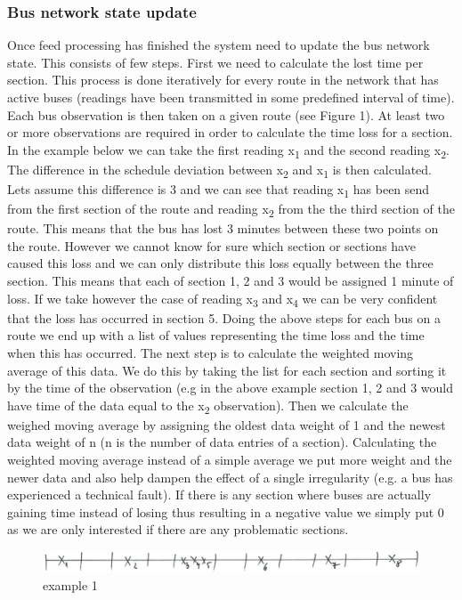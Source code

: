 \subsubsection{Bus network state update}
Once feed processing has finished the system need to update the bus network state. This consists of few steps. First we need to calculate the lost time per section. This process is done iteratively for every route in the network that has active buses (readings have been transmitted in some predefined interval of time). Each bus observation is then taken on a given route (see Figure 1). At least two or more observations are required in order to calculate the time loss for a section. In the example below we can take the first reading x\textsubscript{1} and the second reading x\textsubscript{2}.
The difference in the schedule deviation between x\textsubscript{2} and x\textsubscript{1} is then calculated. Lets assume this difference is 3 and we can see that reading x\textsubscript{1} has been send from the first section of the route and reading x\textsubscript{2} from the the third section of the route. This means that the bus has lost 3 minutes between these two points on the route. However we cannot know for sure which section or sections have caused this loss and we can only distribute this loss equally between the three section. This means that each of section 1, 2 and 3 would be assigned 1 minute of loss. If we take however the case of reading x\textsubscript{3} and x\textsubscript{4} we can be very confident that the loss has occurred in section 5. Doing the above steps for each bus on a route we end up with a list of values representing the time loss and the time when this has occurred. The next step is to calculate the weighted moving average of this data. We do this by taking the list for each section and sorting it by the time of the observation (e.g in the above example section 1, 2 and 3 would have time of the data equal to the x\textsubscript{2} observation). Then we calculate the weighed moving average by assigning the oldest data weight of 1 and the newest data weight of n (n is the number of data entries of a section). Calculating the weighted moving average instead of a simple average we put more weight and the newer data and also help dampen the effect of a single irregularity (e.g. a bus has experienced a technical fault). If there is any section where buses are actually gaining time instead of losing thus resulting in a negative value we simply put 0 as we are only interested if there are any problematic sections.
\begin{figure}[ht!]
\includegraphics[scale=0.2]{Figures/figure1.jpg}
\caption{example 1 \label{overflow}}
\end{figure}
